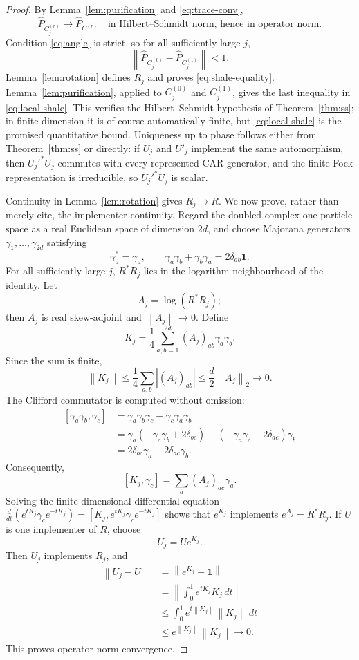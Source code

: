 \documentclass[11pt]{article}
\theoremstyle{remark}
\newcommand{\id}{\mathbf 1}
\newcommand{\norm}[1]{\left\lVert #1\right\rVert}
\begin{document}
\begin{proof}
By Lemma~\ref{lem:purification} and \eqref{eq:trace-conv},
\[
 \widehat P_{C_j^{(r)}}\longrightarrow\widehat P_{C^{(r)}}
 \quad\text{in Hilbert--Schmidt norm, hence in operator norm}.
\]
Condition \eqref{eq:angle} is strict, so for all sufficiently large $j$,
\[
 \norm{\widehat P_{C_j^{(0)}}-\widehat P_{C_j^{(1)}}}<1.
\]
Lemma~\ref{lem:rotation} defines $R_j$ and proves
\eqref{eq:shale-equality}.  Lemma~\ref{lem:purification}, applied to
$C_j^{(0)}$ and $C_j^{(1)}$, gives the last inequality in
\eqref{eq:local-shale}.  This verifies the Hilbert--Schmidt hypothesis of
Theorem~\ref{thm:ss}; in finite dimension it is of course automatically
finite, but \eqref{eq:local-shale} is the promised quantitative bound.
Uniqueness up to phase follows either from Theorem~\ref{thm:ss} or
directly: if $U_j$ and $U'_j$ implement the same automorphism, then
$U_j'^*U_j$ commutes with every represented CAR generator, and the
finite Fock representation is irreducible, so $U_j'^*U_j$ is scalar.

Continuity in Lemma~\ref{lem:rotation} gives $R_j\to R$.  We now prove,
rather than merely cite, the implementer continuity.  Regard the doubled
complex one-particle space as a real Euclidean space of dimension $2d$,
and choose Majorana generators
$\gamma_1,\ldots,\gamma_{2d}$ satisfying
\[
 \gamma_a^*=\gamma_a,\qquad
 \gamma_a\gamma_b+\gamma_b\gamma_a=2\delta_{ab}\id .
\]
For all sufficiently large $j$, $R^*R_j$ lies in the logarithm
neighbourhood of the identity.  Let
\[
 A_j=\log(R^*R_j);
\]
then $A_j$ is real skew-adjoint and $\norm{A_j}\to0$.  Define
\[
 K_j=\frac14\sum_{a,b=1}^{2d}(A_j)_{ab}\gamma_a\gamma_b.
\]
Since the sum is finite,
\[
 \norm{K_j}
 \le\frac14\sum_{a,b}|(A_j)_{ab}|
 \le \frac{d}{2}\norm{A_j}_2
 \longrightarrow0.
\tag{3.8}\label{eq:spin-bound}
\]
The Clifford commutator is computed without omission:
\[
\begin{aligned}
[\gamma_a\gamma_b,\gamma_c]
&=\gamma_a\gamma_b\gamma_c-\gamma_c\gamma_a\gamma_b\\
&=\gamma_a(-\gamma_c\gamma_b+2\delta_{bc})
 -(-\gamma_a\gamma_c+2\delta_{ac})\gamma_b\\
&=2\delta_{bc}\gamma_a-2\delta_{ac}\gamma_b.
\end{aligned}
\]
Consequently,
\[
 [K_j,\gamma_c]
 =\sum_a(A_j)_{ac}\gamma_a.
\]
Solving the finite-dimensional differential equation
$\frac d{dt}(e^{tK_j}\gamma_ce^{-tK_j})
 =[K_j,e^{tK_j}\gamma_ce^{-tK_j}]$
shows that $e^{K_j}$ implements $e^{A_j}=R^*R_j$.
If $U$ is one implementer of $R$, choose
\[
 U_j=Ue^{K_j}.
\]
Then $U_j$ implements $R_j$, and
\[
\begin{aligned}
\norm{U_j-U}
 &=\norm{e^{K_j}-\id}\\
 &=\norm{\int_0^1 e^{tK_j}K_j\,dt}\\
 &\le\int_0^1e^{t\norm{K_j}}\norm{K_j}\,dt\\
 &\le e^{\norm{K_j}}\norm{K_j}\longrightarrow0.
\end{aligned}
\tag{3.9}\label{eq:implementer-norm}
\]
This proves operator-norm convergence.


\end{proof}
\end{document}
